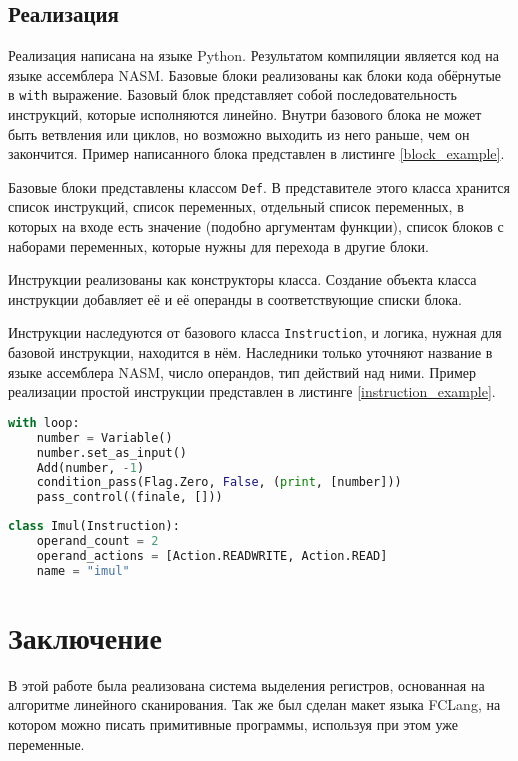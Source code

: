 \documentclass[a4paper,14pt]{extarticle}
\begin{document}
\subsection{Реализация}
Реализация написана на языке Python.
Результатом компиляции является код на языке ассемблера NASM.
Базовые блоки реализованы как блоки кода обёрнутые в \texttt{with} выражение.
Базовый блок представляет собой последовательность инструкций, которые исполняются линейно.
Внутри базового блока не может быть ветвления или циклов,
но возможно выходить из него раньше, чем он закончится.
Пример написанного блока представлен в листинге \ref{block_example}.

Базовые блоки представлены классом \texttt{Def}.
В представителе этого класса хранится список инструкций, список переменных,
отдельный список переменных, в которых на входе есть значение (подобно аргументам функции),
список блоков с наборами переменных, которые нужны для перехода в другие блоки.

Инструкции реализованы как конструкторы класса.
Создание объекта класса инструкции добавляет её и её операнды в соответствующие списки блока.

Инструкции наследуются от базового класса \texttt{Instruction},
и логика, нужная для базовой инструкции, находится в нём.
Наследники только уточняют название в языке ассемблера NASM, число операндов, тип действий над ними.
Пример реализации простой инструкции представлен в листинге \ref{instruction_example}.

\begin{lstlisting}[caption={Пример блока кода}, label=block_example, float, language=Python]
with loop:
    number = Variable()
    number.set_as_input()
    Add(number, -1)
    condition_pass(Flag.Zero, False, (print, [number]))
    pass_control((finale, []))
\end{lstlisting}

\begin{lstlisting}[caption={Пример определения простой инструкции}, label=instruction_example, float, language=Python]
class Imul(Instruction):
    operand_count = 2
    operand_actions = [Action.READWRITE, Action.READ]
    name = "imul"
\end{lstlisting}

\section{Заключение}
В этой работе была реализована система выделения регистров, основанная на алгоритме линейного сканирования.
Так же был сделан макет языка FCLang, на котором можно писать примитивные программы, используя при этом уже переменные.
\end{document}
